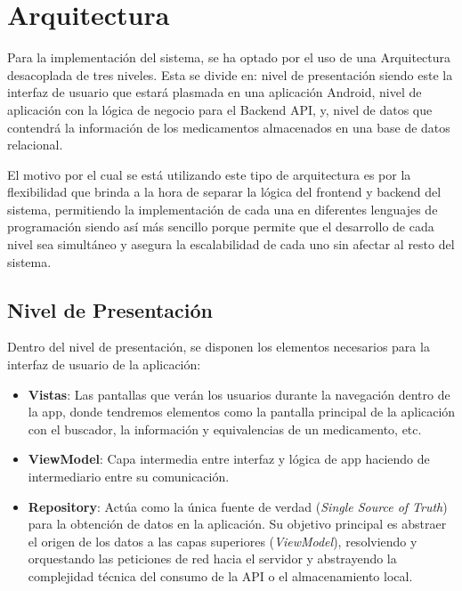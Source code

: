 \documentclass[11pt,a4paper]{article}
\begin{document}
\section{Arquitectura}

Para la implementación del sistema, se ha optado por el uso de una Arquitectura desacoplada de tres niveles. Esta se divide en: nivel de presentación siendo este la interfaz de usuario que estará plasmada en una aplicación Android, nivel de aplicación con la lógica de negocio para el Backend API, y, nivel de datos que contendrá la información de los medicamentos almacenados en una base de datos relacional\cite{1}.

El motivo por el cual se está utilizando este tipo de arquitectura es por la flexibilidad que brinda a la hora de separar la lógica del frontend y backend del sistema, permitiendo la implementación de cada una en diferentes lenguajes de programación siendo así más sencillo porque permite que el desarrollo de cada nivel sea simultáneo y asegura la escalabilidad de cada uno sin afectar al resto del sistema\cite{1}.


\subsection{Nivel de Presentación}

Dentro del nivel de presentación, se disponen los elementos necesarios para la interfaz de usuario de la aplicación:

\begin{itemize}
    \item \textbf{Vistas}: Las pantallas que verán los usuarios durante la navegación dentro de la app, donde tendremos elementos como la pantalla principal de la aplicación con el buscador, la información y equivalencias de un medicamento, etc.
    \item \textbf{ViewModel}: Capa intermedia entre interfaz y lógica de app haciendo de intermediario entre su comunicación. 
    \item \textbf{Repository}: Actúa como la única fuente de verdad (\textit{Single Source of Truth}) para la obtención de datos en la aplicación. Su objetivo principal es abstraer el origen de los datos a las capas superiores (\textit{ViewModel}), resolviendo y orquestando las peticiones de red hacia el servidor y abstrayendo la complejidad técnica del consumo de la API o el almacenamiento local.
\end{itemize}
\end{document}
